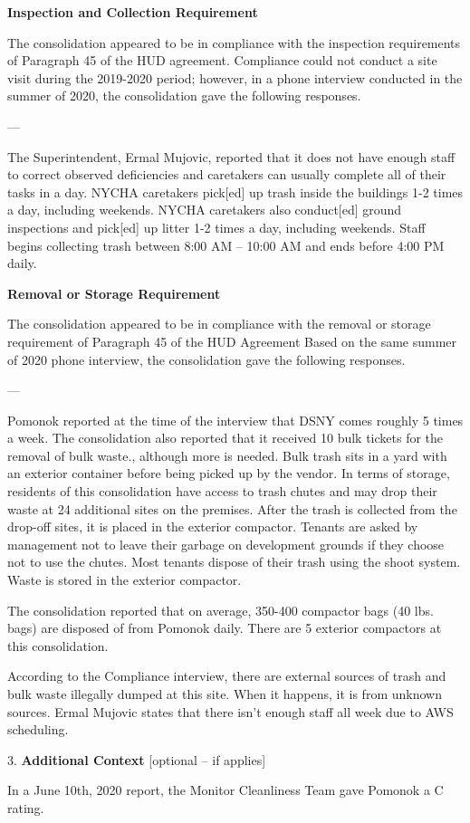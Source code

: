 

\textbf{Inspection and Collection Requirement}

The consolidation appeared to be in compliance with the inspection requirements of Paragraph 45 of the HUD agreement. Compliance could not conduct a site visit during the 2019-2020 period; however, in a phone interview conducted in the summer of 2020, the consolidation gave the following responses.

---

The Superintendent, Ermal Mujovic, reported that it does not have enough staff to correct observed deficiencies and caretakers can usually complete all of their tasks in a day. NYCHA caretakers pick[ed] up trash inside the buildings 1-2 times a day, including weekends. NYCHA caretakers also conduct[ed] ground inspections and pick[ed] up litter 1-2 times a day, including weekends. Staff begins collecting trash between 8:00 AM -- 10:00 AM and ends before 4:00 PM daily.

\textbf{Removal or Storage Requirement}

The consolidation appeared to be in compliance with the  removal or storage requirement of Paragraph  45 of the HUD  Agreement Based on the same summer of  2020 phone interview, the consolidation gave the following responses.

---

Pomonok reported at the time of the interview that DSNY comes roughly 5 times a week. The consolidation also reported that it received 10 bulk tickets for the removal of bulk waste., although more is needed. Bulk trash sits in a yard with an exterior container before being picked up by the vendor. In terms of storage, residents of this consolidation have access to trash chutes and may drop their waste at 24 additional sites on the premises. After the trash is collected from the drop-off sites, it is placed in the exterior compactor. Tenants are asked by management not to leave their garbage on development grounds if they choose not to use the chutes. Most tenants dispose of their trash using the shoot system. Waste is stored in the exterior compactor. 

The consolidation reported that on average, 350-400 compactor bags (40 lbs. bags) are disposed of from Pomonok daily. There are 5 exterior compactors at this consolidation. 

According to the Compliance interview, there are external sources of trash and bulk waste illegally dumped at this site. When it happens, it is from unknown sources. Ermal Mujovic states that there isn't enough staff all week due to AWS scheduling. 

3. \textbf{Additional Context} [optional -- if applies]

In a June 10th, 2020 report, the Monitor Cleanliness Team gave Pomonok a C rating. 